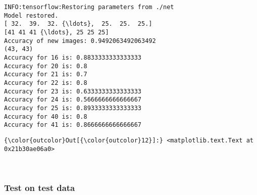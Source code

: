 \documentclass[11pt]{article}
\begin{document}
    \begin{Verbatim}[commandchars=\\\{\}]
INFO:tensorflow:Restoring parameters from ./net
Model restored.
[ 32.  39.  32. {\ldots},  25.  25.  25.]
[41 41 41 {\ldots}, 25 25 25]
Accuracy of new images: 0.9492063492063492
(43, 43)
Accuracy for 16 is: 0.8833333333333333
Accuracy for 20 is: 0.8
Accuracy for 21 is: 0.7
Accuracy for 22 is: 0.8
Accuracy for 23 is: 0.6333333333333333
Accuracy for 24 is: 0.5666666666666667
Accuracy for 25 is: 0.8933333333333333
Accuracy for 40 is: 0.8
Accuracy for 41 is: 0.8666666666666667

    \end{Verbatim}

\begin{Verbatim}[commandchars=\\\{\}]
{\color{outcolor}Out[{\color{outcolor}12}]:} <matplotlib.text.Text at 0x21b30ae06a0>
\end{Verbatim}
            
    \begin{center}
    \end{center}
    { \hspace*{\fill} \\}
    
    \hypertarget{test-on-test-data}{%
\subsubsection{Test on test data}\label{test-on-test-data}}
\end{document}
